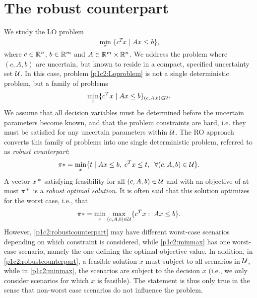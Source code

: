 \section{The robust counterpart}

We study the LO problem
\begin{align}\label{p1c2:Loproblem}
	\min\limits_x\{c^Tx\mid Ax\leq b\},
\end{align}
where $c\in\mathbb{R}^n$, $b\in\mathbb{R}^m$ and $A\in\mathbb{R}^m\times\mathbb{R}^n$. We address the problem where $(c,A,b)$ are uncertain, but known to reside in a compact, specified uncertainty set $\mathcal{U}$. In this case, problem \eqref{p1c2:Loproblem} is not a single deterministic problem, but a family of problems
\begin{align}
	\min\limits_x\{c^Tx\mid Ax\leq b\}_{(c,A,b)\in\mathcal{U}}.
\end{align}
We assume that all decision variables must be determined before the uncertain parameters become known, and that the problem constraints are hard, i.e. they must be satisfied for any uncertain parameters within $\mathcal{U}$. The RO approach converts this family of problems into one single deterministic problem, referred to as \textit{robust counterpart}:
\begin{align}\label{p1c2:robustcounterpart}
	\pi* = \min\limits_x \{t \mid Ax\leq b,\;c^Tx\leq t,\;\;\forall (c,A,b)\in\mathcal{U}\}.
\end{align}
A vector $x*$ satisfying feasibility for all $(c,A,b)\in\mathcal{U}$ and with an objective of at most $\pi*$ is a \textit{robust optimal solution}. It is often said that this solution optimizes for the worst case, i.e., that
\begin{align}\label{p1c2:minmax}
\pi* = \min\limits_x \max\limits_{(c,A,b)\in\mathcal{U}} \{c^T x:\;Ax\leq b\}.
\end{align}
However, \eqref{p1c2:robustcounterpart} may have different worst-case scenarios depending on which constraint is considered, while \eqref{p1c2:minmax} has one worst-case scenario, namely the one defining the optimal objective value. In addition, in \eqref{p1c2:robustcounterpart}, a feasible solution $x$ must subject to all scenarios in $\mathcal{U}$, while in \eqref{p1c2:minmax}, the scenarios are subject to the decision $x$ (i.e., we only consider scenarios for which $x$ is feasible). The statement is thus only true in the sense that non-worst case scenarios do not influence the problem. 

